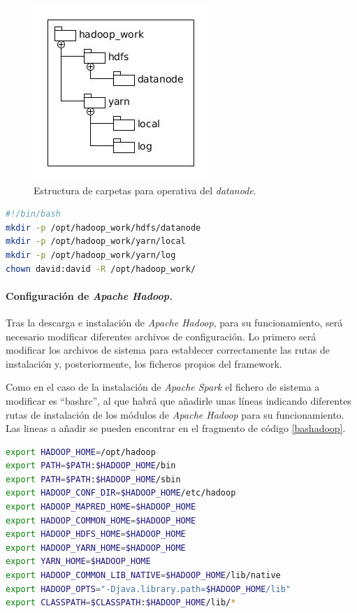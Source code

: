 \begin{figure}[htp!] 
	\centering		
	\caption{Estructura de carpetas para operativa del \textit{datanode}.}
	\label{fig:estructSlave}
	\vspace{5pt}
	\includegraphics[scale=0.8]{graphics/estructSlave}
\end{figure}

\begin{lstlisting}[label=cod:estructSlave,language=sh,frame=single,caption=Codigo de creación de la estructura de carpetas del \textit{datanode}.]
#!/bin/bash
mkdir -p /opt/hadoop_work/hdfs/datanode
mkdir -p /opt/hadoop_work/yarn/local
mkdir -p /opt/hadoop_work/yarn/log
chown david:david -R /opt/hadoop_work/
\end{lstlisting}

\clearpage
\paragraph{Configuración de \textit{Apache Hadoop.}}
Tras la descarga e instalación de \textit{Apache Hadoop}, para su funcionamiento, será necesario modificar diferentes archivos de configuración. Lo primero será modificar los archivos de sistema para establecer correctamente las rutas de instalación y, posteriormente, los ficheros propios del \gls{framework}.

Como en el caso de la instalación de \textit{Apache Spark} el fichero de sistema a modificar es ``bashrc'', al que habrá que añadirle unas líneas indicando diferentes rutas de instalación de los módulos de \textit{Apache Hadoop} para su funcionamiento. Las lineas a añadir se pueden encontrar en el fragmento de código \ref{bashadoop}.

\begin{lstlisting}[label=bashadoop,language=sh,frame=single,caption=Líneas a añadir a ``.bashrc'' para el funcionamiento de \textit{Apache Hadoop}.]
export HADOOP_HOME=/opt/hadoop
export PATH=$PATH:$HADOOP_HOME/bin
export PATH=$PATH:$HADOOP_HOME/sbin
export HADOOP_CONF_DIR=$HADOOP_HOME/etc/hadoop
export HADOOP_MAPRED_HOME=$HADOOP_HOME
export HADOOP_COMMON_HOME=$HADOOP_HOME
export HADOOP_HDFS_HOME=$HADOOP_HOME
export HADOOP_YARN_HOME=$HADOOP_HOME
export YARN_HOME=$HADOOP_HOME
export HADOOP_COMMON_LIB_NATIVE=$HADOOP_HOME/lib/native
export HADOOP_OPTS="-Djava.library.path=$HADOOP_HOME/lib"
export CLASSPATH=$CLASSPATH:$HADOOP_HOME/lib/*
\end{lstlisting}

